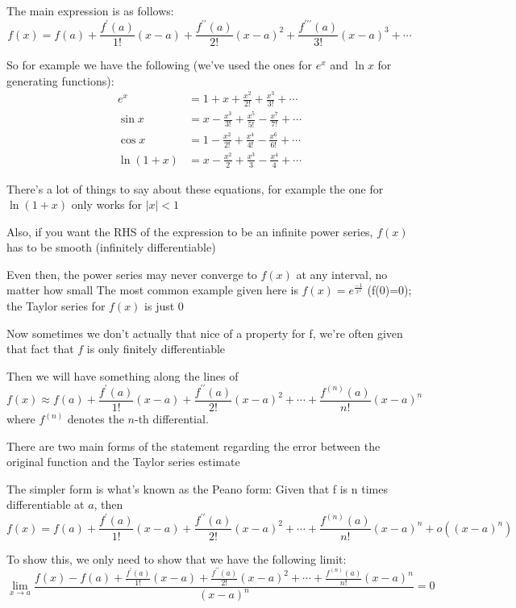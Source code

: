 
The main expression is as follows:
\begin{equation}
f(x)=f(a)+\frac{f^\prime(a)}{1!}(x-a)+\frac{f^{\prime\prime}(a)}{2!}(x-a)^2+\frac{f^{\prime\prime\prime}(a)}{3!}(x-a)^3+\cdots
\end{equation}

So for example we have the following (we've used the ones for $e^x$ and $\ln x$ for generating functions):
\begin{align*}
e^x &= 1+x+\frac{x^2}{2!}+\frac{x^3}{3!}+\cdots \\
\sin x &= x-\frac{x^3}{3!}+\frac{x^5}{5!}-\frac{x^7}{7!}+\cdots \\
\cos x &= 1-\frac{x^2}{2!}+\frac{x^4}{4!}-\frac{x^6}{6!}+\cdots \\
\ln(1+x) &= x-\frac{x^2}{2}+\frac{x^3}{3}-\frac{x^4}{4}+\cdots
\end{align*}

There's a lot of things to say about these equations, for example the one for $\ln(1+x)$ only works for $|x|<1$

Also, if you want the RHS of the expression to be an infinite power series, $f(x)$ has to be smooth (infinitely differentiable)

Even then, the power series may never converge to $f(x)$ at any interval, no matter how small
The most common example given here is $f(x)=e^\frac{-1}{x^2}$ (f(0)=0); the Taylor series for $f(x)$ is just $0$

Now sometimes we don't actually that nice of a property for f, we're often given that fact that $f$ is only finitely differentiable

Then we will have something along the lines of
\[ f(x)\approx f(a)+\frac{f^\prime(a)}{1!}(x-a)+\frac{f^{\prime\prime}(a)}{2!}(x-a)^2+\cdots+\frac{f^{(n)}(a)}{n!}(x-a)^n \]
where $f^{(n)}$ denotes the $n$-th differential.

There are two main forms of the statement regarding the error between the original function and the Taylor series estimate

The simpler form is what's known as the Peano form: Given that f is n times differentiable at $a$, then
\[ f(x)=f(a)+\frac{f^\prime(a)}{1!}(x-a)+\frac{f^{\prime\prime}(a)}{2!}(x-a)^2+\cdots+\frac{f^{(n)}(a)}{n!}(x-a)^n+o((x-a)^n) \]

To show this, we only need to show that we have the following limit:
\[ \lim_{x\to a}\frac{f(x)-{f(a)+\frac{f^\prime(a)}{1!}(x-a)+\frac{f^{\prime\prime}(a)}{2!}(x-a)^2+\cdots+\frac{f^{(n)}(a)}{n!}(x-a)^n}}{(x-a)^n}=0 \]

